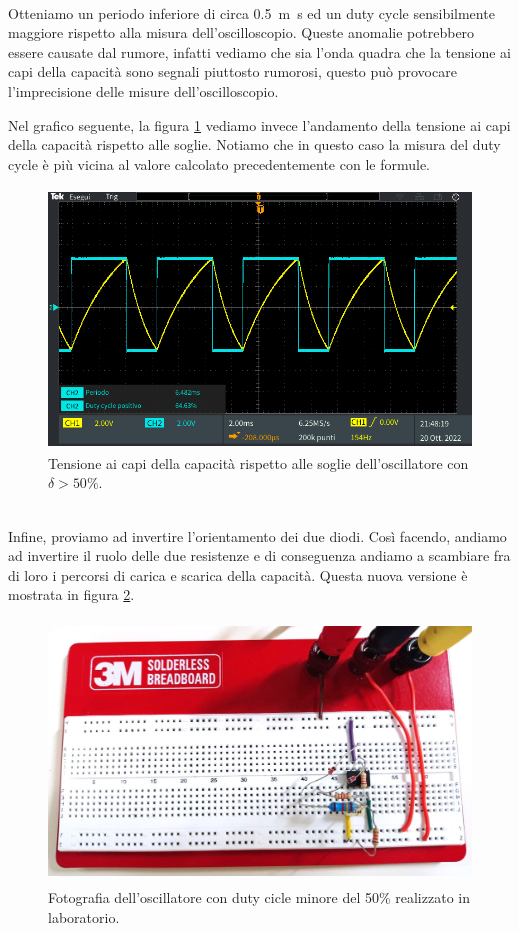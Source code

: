 \documentclass{report}
\begin{document}
\\[4pt]Otteniamo un periodo inferiore di circa \SI{0.5}{m\second} ed un duty cycle sensibilmente maggiore rispetto alla misura dell'oscilloscopio. Queste anomalie potrebbero essere causate dal rumore, infatti vediamo che sia l'onda quadra che la tensione ai capi della capacità sono segnali piuttosto rumorosi, questo può provocare l'imprecisione delle misure dell'oscilloscopio.\par
Nel grafico seguente, la figura \ref{figura:oscillo4_1_soglie} vediamo invece l'andamento della tensione ai capi della capacità rispetto alle soglie. Notiamo che in questo caso la misura del duty cycle è più vicina al valore calcolato precedentemente con le formule.
\begin{figure}[h!]
	\centering
	\includegraphics[height=6.9cm]{immagini/TEK00038}
	\caption{Tensione ai capi della capacità rispetto alle soglie dell'oscillatore con $\delta>50\%$.}
	\label{figura:oscillo4_1_soglie}
\end{figure}
\\Infine, proviamo ad invertire l'orientamento dei due diodi. Così facendo, andiamo ad invertire il ruolo delle due resistenze e di conseguenza andiamo a scambiare fra di loro i percorsi di carica e scarica della capacità. Questa nuova versione è mostrata in figura \ref{figura:circuito4_2}.
\begin{figure}[h!]
	\centering
	\includegraphics[height=7cm]{immagini/circuito4_2.jpg}
	\caption{Fotografia dell'oscillatore con duty cicle minore del 50\% realizzato in laboratorio.}
	\label{figura:circuito4_2}
\end{figure}
\end{document}
